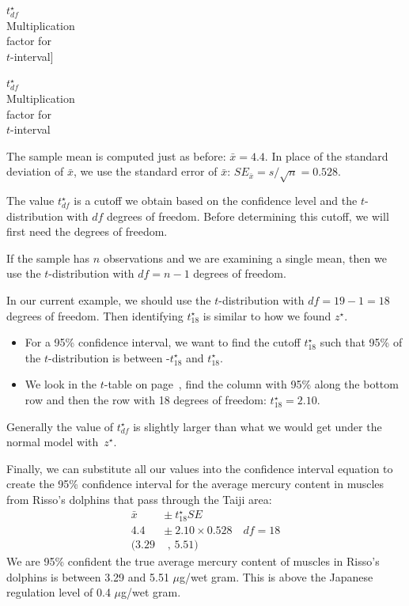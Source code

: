 $t^{\star}_{df}$\vspace{1mm}\\\footnotesize Multiplication\\factor for\\$t$-interval]{\raggedright\vspace{-9mm}

$t^{\star}_{df}$\vspace{1mm}\\\footnotesize Multiplication\\factor for\\$t$-interval}The sample mean is computed just as before: $\bar{x} = 4.4$. In place of the standard deviation of $\bar{x}$, we use the standard error of $\bar{x}$: $SE_{\bar{x}} = s/\sqrt{n} = 0.528$.

The value $t^{\star}_{df}$ is a cutoff we obtain based on the confidence level and the $t$-distribution with $df$ degrees of freedom. Before determining this cutoff, we will first need the degrees of freedom.

\begin{termBox}{
If the sample has $n$ observations and we are examining a single mean, then we use the $t$-distribution with $df=n-1$ degrees of freedom.}
\end{termBox}

In our current example, we should use the $t$-distribution with $df=19-1=18$ degrees of freedom. Then identifying $t_{18}^{\star}$ is similar to how we found $z^{\star}$.
\begin{itemize}
\setlength{\itemsep}{0mm}
\item For a 95\% confidence interval, we want to find the cutoff $t^{\star}_{18}$ such that 95\% of the $t$-distribution is between -$t^{\star}_{18}$ and $t^{\star}_{18}$.
\item We look in the $t$-table on page~\pageref{tTableSample_ch_inf_means}, find the column with 95\% along the bottom row and then the row with 18 degrees of freedom: $t^{\star}_{18} = 2.10$.
\end{itemize}
Generally the value of $t^{\star}_{df}$ is slightly larger than what we would get under the normal model with~$z^{\star}$.

Finally, we can substitute all our values into the confidence interval equation to create the 95\% confidence interval for the average mercury content in muscles from Risso's dolphins that pass through the Taiji area:
\begin{align*}
\bar{x} \ &\pm\  t^{\star}_{18}SE  \\
4.4 \ &\pm\  2.10 \times 0.528 \quad df=18 \\
(3.29 &\text{ , } 5.51)
\end{align*}
We are 95\% confident the true average mercury content of muscles in Risso's dolphins is between 3.29 and 5.51 $\mu$g/wet gram. This is above the Japanese regulation level of 0.4 $\mu$g/wet gram.

